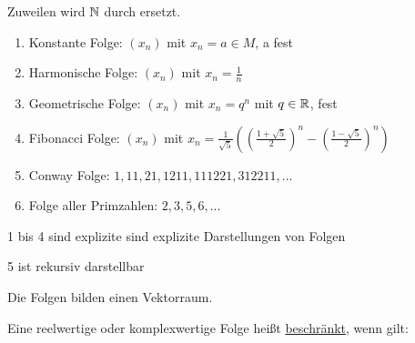 \documentclass{../tudscript}
\begin{document}
                Zuweilen wird $\mathbb{N}$ durch
                ersetzt.
                
                \begin{enumerate}
                    \item Konstante Folge: $(x_n)$ mit $x_n = a \in M$, a fest
                    \item Harmonische Folge: $(x_n)$ mit $x_n = \frac{1}{n}$
                    \item Geometrische Folge: $(x_n)$ mit $x_n = q^n$ mit $q \in \mathbb{R}$, fest
                    \item Fibonacci Folge: $(x_n)$ mit $x_n = \frac{1}{\sqrt{5}} ((\frac{1 + \sqrt{5}}{2})^n - (\frac{1-\sqrt{5}}{2})^n)$
                    \item Conway Folge: $1, 11, 21, 1211, 111221, 312211, ...$
                    \item Folge aller Primzahlen: $2, 3, 5, 6, ...$
                \end{enumerate}
                    1 bis 4 sind explizite sind explizite Darstellungen von Folgen
                    
                    5 ist rekursiv darstellbar
                
                
                Die Folgen bilden einen Vektorraum.

                Eine reelwertige oder komplexwertige Folge heißt
                \underline{beschränkt}, wenn gilt:
\end{document}
